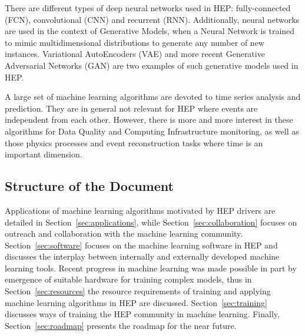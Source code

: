 There are different types of deep neural networks used in HEP: fully-connected (FCN), convolutional (CNN) and recurrent (RNN). Additionally, neural networks are used in the context of Generative Models, when a Neural Network is trained to mimic multidimensional distributions to generate any number of new instances. Variational AutoEncoders (VAE) and more recent Generative Adversarial Networks (GAN) are two examples of such generative models used in HEP.

A large set of machine learning algorithms are devoted to time series analysis and prediction. They are in general not relevant for HEP where events are independent from each other. However, there is more and more interest in these algorithms for Data Quality and Computing Infrastructure monitoring, as well as those physics processes and event reconstruction tasks where time is an important dimension.


\subsection{Structure of the Document}


Applications of machine learning algorithms motivated by HEP drivers are detailed in Section~\ref{sec:applications}, while Section~\ref{sec:collaboration} focuses on outreach and collaboration with the machine learning community. Section~\ref{sec:software} focuses on the machine learning software in HEP and discusses the interplay between internally and externally developed machine learning tools. Recent progress in machine learning was made possible in part by emergence of suitable hardware for training complex models, thus in Section~\ref{sec:resources} the resource requirements of training and applying machine learning algorithms in HEP are discussed. Section~\ref{sec:training} discusses ways of training the HEP community in machine learning.  Finally, Section~\ref{sec:roadmap} presents the roadmap for the near future.


